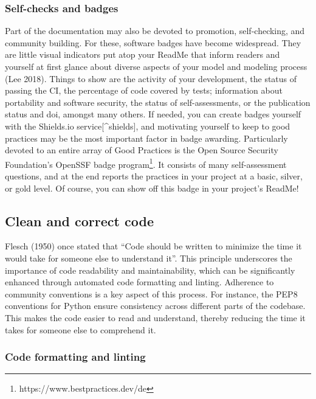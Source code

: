 \documentclass[preprint,11pt,5p]{elsarticle}
\begin{document}
\subsubsection{Self-checks and badges}\label{self-checks-and-badges}

Part of the documentation may also be devoted to promotion,
self-checking, and community building. For these, software badges have
become widespread. They are little visual indicators put atop your
ReadMe that inform readers and yourself at first glance about diverse
aspects of your model and modeling process (Lee 2018). Things to show
are the activity of your development, the status of passing the CI, the
percentage of code covered by tests; information about portability and
software security, the status of self-assessments, or the publication
status and doi, amongst many others. If needed, you can create badges
yourself with the Shields.io service{[}\^{}shields{]}, and motivating
yourself to keep to good practices may be the most important factor in
badge awarding. Particularly devoted to an entire array of Good
Practices is the Open Source Security Foundation's OpenSSF badge
program\footnote{https://www.bestpractices.dev/de}. It consists of many
self-assessment questions, and at the end reports the practices in your
project at a basic, silver, or gold level. Of course, you can show off
this badge in your project's ReadMe!

\subsection{Clean and correct code}\label{clean-and-correct-code}

Flesch (1950) once stated that ``Code should be written to minimize the
time it would take for someone else to understand it''. This principle
underscores the importance of code readability and maintainability,
which can be significantly enhanced through automated code formatting
and linting. Adherence to community conventions is a key aspect of this
process. For instance, the PEP8 conventions for Python ensure
consistency across different parts of the codebase. This makes the code
easier to read and understand, thereby reducing the time it takes for
someone else to comprehend it.

\subsubsection{Code formatting and
linting}\label{code-formatting-and-linting}
\end{document}
